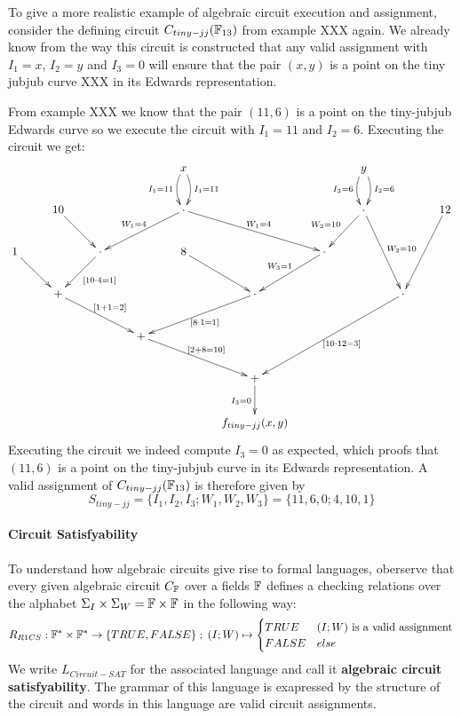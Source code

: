 \begin{example} To give a more realistic example of algebraic circuit execution and assignment, consider the defining circuit $C_{tiny-jj}(\mathbb{F}_{13})$ from example XXX again. We already know from the way this circuit is constructed that any valid assignment with $I_1=x$, $I_2=y$ and $I_3=0$ will ensure that the pair $(x,y)$ is a point on the tiny jubjub curve XXX in its Edwards representation. 

From example XXX we know that the pair $(11,6)$ is a point on the tiny-jubjub Edwards curve so we execute the circuit with $I_1=11$ and $I_2=6$. Executing the circuit we get:
\begingroup
    \fontsize{8pt}{10pt}\selectfont
\[
\xymatrix{
 & &  & &
x\ar^{I_1=11}@/^/[d]\ar_{I_1=11}@/_/[d]  &  & & 
y\ar^{I_2=6}@/^/[d]\ar_{I_3=6}@/_/[d]\\
 & 10 \ar[dr]& & &
\cdot \ar^{W_1=4}[drr] \ar_{W_1=4}[dll]&  & &
\cdot \ar_{W_2=10}[dl] \ar^{W_2=10}[ddr] &  &
12 \ar[ddl] \\
1 \ar[dr] & &  
 \cdot \ar^{[10\cdot 4 = 1]}[dl] & & 
 8 \ar[dr] & &
 \cdot \ar_{W_3=1}[dl] & & 
 \\
 & 
 + \ar^{[1+1=2]}[drr] & & & &
 \cdot \ar^{[8\cdot 1 = 1]}[dll] & & &
 \cdot \ar^{[10\cdot 12=3]}[ddlll]\\
 & & & 
 + \ar^{[2+8=10]}[drr]& & & 
 \\
 & & & & & 
 + \ar_{I_3=0}[d]\\
 & & & & & 
 f_{tiny-jj}(x,y)
}
\]
\endgroup
Executing the circuit we indeed compute $I_3=0$ as expected, which proofs that $(11,6)$ is a point on the tiny-jubjub curve in its Edwards representation. A valid assignment of $C_{tiny-jj}(\mathbb{F}_{13})$ is therefore given by 
$$
S_{tiny-jj} = \{I_1, I_2, I_3; W_1, W_2, W_3\} = \{11, 6, 0; 4, 10, 1\}
$$
\end{example}

\paragraph{Circuit Satisfyability} To understand how algebraic circuits give rise to formal languages, oberserve that every given algebraic circuit $C_{\mathbb{F}}$ over a fields $\mathbb{F}$ defines a checking relations over the alphabet $\Sigma_I \times \Sigma_W = \mathbb{F} \times \mathbb{F}$ in the following way:
\begin{equation}
R_{R1CS} : \mathbb{F}^* \times \mathbb{F}^* \to \{TRUE, FALSE\}\;;\;
(I;W) \mapsto
\begin{cases}
TRUE & (I;W) \text{ is a valid assignment}\\
FALSE & else
\end{cases}
\end{equation}
We write $L_{Circuit-SAT}$ for the associated language and call it \textbf{algebraic circuit satisfyability}. The grammar of this language is exapressed by the structure of the circuit and words in this language are valid circuit assignments. 

